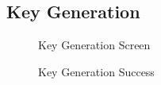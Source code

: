 \documentclass[]{final_report}
\theoremstyle{definition}
\begin{document}
\subsection{Key Generation}
\begin{figure}[h]
    \centering %
    
    \begin{minipage}{0.49\textwidth}
        \centering
        \caption{Key Generation Screen}
        \label{fig:image1}
    \end{minipage}
    \hfill %
    \begin{minipage}{0.49\textwidth}
        \centering
        \caption{Key Generation Success}
        \label{fig:image2}
    \end{minipage}
\end{figure}
\end{document}
